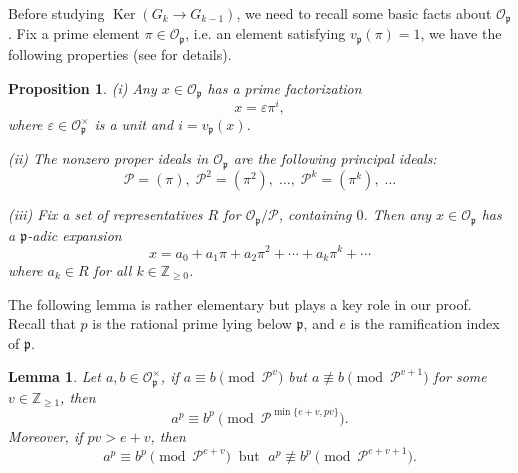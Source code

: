 \documentclass[12pt]{amsart}
\theoremstyle{plain}
\newtheorem{prop}{Proposition}[section]
\newtheorem{lem}{Lemma}[section]
\theoremstyle{definition}
\theoremstyle{remark}
\numberwithin{equation}{section}
\DeclareMathOperator{\ke}{Ker}
\newcommand{\Z}{\mathbb Z}
\begin{document}
	Before studying \( \ke(G_k \to G_{k-1}) \), we need to recall some basic facts about \( \mathcal{O}_\mathfrak{p} \). Fix a prime element \( \pi \in \mathcal{O}_\mathfrak{p} \), i.e. an element satisfying $ v_\mathfrak{p}(\pi) = 1$, we have the following properties (see \cite[Chapter II, Section 3 and 4]{Neu1992} for details).
	\begin{prop}\label{2512231208}
		(i) Any \( x \in \mathcal{O}_\mathfrak{p} \) has a prime factorization
		\[ x = \varepsilon \pi^i, \]
		where \( \varepsilon \in \mathcal{O}_\mathfrak{p}^{\times} \) is a unit and \( i = v_\mathfrak{p}(x) \). 
		
		\noindent(ii) The nonzero proper ideals in \( \mathcal{O}_\mathfrak{p}\) are the following principal ideals:
		\[ \mathcal{P} = (\pi), \; \mathcal{P}^2 = (\pi^2), \; \ldots, \; \mathcal{P}^k = (\pi^k), \; \ldots \]
		
		\noindent(iii) Fix a set of representatives \( R \) for \( \mathcal{O}_\mathfrak{p}/\mathcal{P} \), containing \( 0 \). Then any \( x \in \mathcal{O}_\mathfrak{p} \) has a \( \mathfrak{p} \)-adic expansion
		\begin{equation*}
			x = a_0 + a_1 \pi + a_2 \pi^2 + \cdots + a_k \pi^k + \cdots 
		\end{equation*}
		where \( a_k \in R \) for all \( k \in \mathbb{Z}_{\geq 0} \).
	\end{prop}
	
	The following lemma is rather elementary but plays a key role in our proof. 
	Recall that $p$ is the rational prime lying below $\mathfrak{p}$, and $e$ is the ramification index of $\mathfrak{p}$.
	
	\begin{lem}\label{2601061529}
		Let $a,b\in\mathcal{O}_{\mathfrak{p}}^{\times}$, if 
		$a\equiv b\!\!\pmod{\mathcal{P}^v}$ but $a\not\equiv b\!\!\pmod{\mathcal{P}^{v+1}}$ for some $v\in\Z_{\ge1}$, then 
		\begin{equation}\label{25112141150}
			a^p\equiv b^p\!\!\pmod{\mathcal{P}^{\min\{e+v,pv\}}}. 
		\end{equation}
		Moreover, if $pv>e+v$, then
		\begin{equation}\label{2512141206}
			a^p\equiv b^p\!\!\pmod{\mathcal{P}^{e+v}}\;\;\text{but }\;a^p\not\equiv b^p\!\!\pmod{\mathcal{P}^{e+v+1}}.
		\end{equation}
	\end{lem}
	
\end{document}
